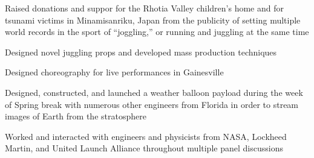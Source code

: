 \documentclass[letterpaper]{article}
\begin{document}
\begin{compactitem}
	\item Raised donations and suppor for the Rhotia Valley children’s home and for tsunami victims in Minamisanriku, Japan from the publicity of setting multiple world records in the sport of “joggling,” or running and juggling at the same time
\end{compactitem}

\begin{compactitem}
	\item Designed novel juggling props and developed mass production techniques\\
	\item Designed choreography for live performances in Gainesville
\end{compactitem}

\begin{compactitem}
	\item Designed, constructed, and launched a weather balloon payload during the week of Spring break with numerous other engineers from Florida in order to stream images of Earth from the stratosphere\\
	\item Worked and interacted with engineers and physicists from NASA, Lockheed Martin, and United Launch Alliance throughout multiple panel discussions
\end{compactitem}


\noindent{\Large\textbf {\\ACHIEVEMENTS}}
\end{document}
